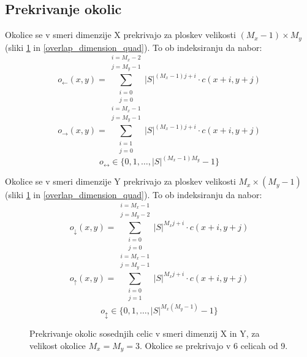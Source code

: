 \documentclass[12pt,a4paper,openany,twoside]{book}
\begin{document}
\subsection{Prekrivanje okolic}

Okolice se v smeri dimenzije X prekrivajo za ploskev velikosti \((M_x-1) \times M_y\) (sliki \ref{overlap_dimension_moore} in \ref{overlap_dimension_quad}).
To ob indeksiranju da nabor:
\begin{equation}
o_{\leftarrow}(x,y) = \sum_{\substack{i=0 \\ j=0}}^{\substack{i=M_x-2 \\ j=M_y-1}} |S|^{(M_x-1) j + i} \cdot c(x+i,y+j)
\end{equation}
\begin{equation}
o_{\rightarrow}(x,y) = \sum_{\substack{i=1 \\ j=0}}^{\substack{i=M_x-1 \\ j=M_y-1}} |S|^{(M_x-1) j + i} \cdot c(x+i,y+j)
\end{equation}
\begin{equation}
o_{\leftrightarrow} \in \{0, 1, \ldots, |S|^{(M_x-1)M_y}-1\}
\end{equation}

Okolice se v smeri dimenzije Y prekrivajo za ploskev velikosti \(M_x \times (M_y-1)\) (sliki \ref{overlap_dimension_moore} in \ref{overlap_dimension_quad}).
To ob indeksiranju da nabor:
\begin{equation}
o_{\downarrow}(x,y) = \sum_{\substack{i=0 \\ j=0}}^{\substack{i=M_x-1 \\ j=M_y-2}} |S|^{M_x j + i} \cdot c(x+i,y+j)
\end{equation}
\begin{equation}
o_{\uparrow}(x,y) = \sum_{\substack{i=0 \\ j=1}}^{\substack{i=M_x-1 \\ j=M_y-1}} |S|^{M_x j + i} \cdot c(x+i,y+j)
\end{equation}
\begin{equation}
o_{\updownarrow} \in \{0, 1, \ldots, |S|^{M_x(M_y-1)}-1\}
\end{equation}

\vspace{5mm}
\begin{figure}[htb]
\centerline{}
\caption[Prekrivaje okolic \(3 \times 3\) v smeri dimenzij X in Y.]
{Prekrivanje okolic sosednjih celic v smeri dimenzij X in Y, za velikost okolice \(M_x=M_y=3\).
Okolice se prekrivajo v 6 celicah od 9.}
\label{overlap_dimension_moore}
\end{figure}
\end{document}
